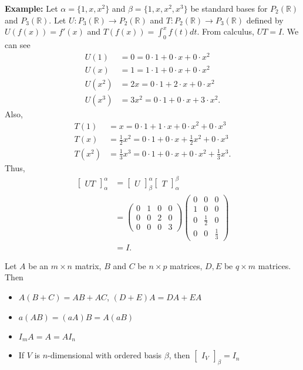 \documentclass[12pt]{article}
\newenvironment{theorem}[2][Theorem]{\begin{trivlist}
\item[\hskip \labelsep {\bfseries #1}\hskip \labelsep {\bfseries #2.}]}{\end{trivlist}}
\begin{document}
\noindent\textbf{Example:} Let $\alpha = \{1, x, x^2\}$ and  $\beta = \{1, x, x^2, x^3\}$ be standard bases for $P_2(\mathbb{R})$ and $P_3(\mathbb{R})$. Let $U : P_3(\mathbb{R}) \to P_2(\mathbb{R})$ and $T : P_2(\mathbb{R}) \to P_3(\mathbb{R})$ defined by $U(f(x)) = f'(x)$ and $T(f(x)) = \int_0^xf(t)dt.$ From calculus, $UT = I$. We can see 
\begin{align*}
    U(1) &= 0 = 0\cdot 1 + 0 \cdot x + 0 \cdot x^2 \\ U(x)&= 1 = 1 \cdot 1 + 0 \cdot x + 0 \cdot x^2 \\ U(x^2) &= 2x = 0 \cdot 1 + 2 \cdot x + 0 \cdot x^2 \\ U(x^3) &= 3x^2 = 0 \cdot 1 + 0 \cdot x + 3 \cdot x^2.
\end{align*} Also,
\begin{align*}
    T(1) &= x = 0 \cdot 1 + 1 \cdot x + 0 \cdot x^2 + 0 \cdot x^3 \\ T(x) &= \frac{1}{2}x^2 = 0 \cdot 1 + 0 \cdot x + \frac{1}{2}x^2 + 0 \cdot x^3 \\ T(x^2) &= \frac{1}{3}x^3 = 0 \cdot 1 + 0 \cdot x + 0 \cdot x^2 + \frac{1}{3}x^3.
\end{align*} Thus,
\begin{align*}
    \begin{bmatrix}
UT
\end{bmatrix}_\alpha^\alpha &= \begin{bmatrix}
U
\end{bmatrix}_\beta^\alpha \begin{bmatrix}
T
\end{bmatrix}_\alpha^\beta \\
&= \begin{pmatrix}
0 & 1 & 0 & 0 \\ 0 & 0 & 2 & 0\\ 0 & 0 & 0 & 3
\end{pmatrix}\begin{pmatrix}
0 & 0 & 0 \\ 1 & 0 & 0 \\ 0 & \frac{1}{2} & 0 \\ 0 & 0 & \frac{1}{3}
\end{pmatrix} \\
&= I.
\end{align*}


\begin{theorem}{2.12}
Let $A$ be an $m \times n$ matrix, $B$ and $C$ be $n \times p$ matrices, $D, E$ be $q \times m$ matrices. Then 
\begin{itemize}
    \item $A(B + C) = AB + AC$, $(D + E)A = DA + EA$
    \item $a(AB) = (aA)B = A(aB)$
    \item $I_mA = A = AI_n$
    \item If $V$ is $n$-dimensional with ordered basis $\beta$, then $\begin{bmatrix} I_V \end{bmatrix}_\beta = I_n$
\end{itemize}
\end{theorem}
\end{document}
